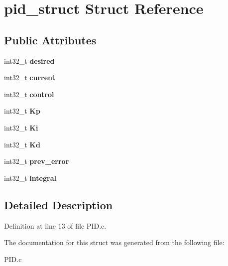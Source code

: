 \hypertarget{structpid__struct}{
\section{pid\_\-struct Struct Reference}
\label{structpid__struct}
}
\subsection*{Public Attributes}
\begin{DoxyCompactItemize}
\item 
\hypertarget{structpid__struct_ab1f8874dfbb425f23481694b028985fb}{
int32\_\-t {\bfseries desired}}
\label{structpid__struct_ab1f8874dfbb425f23481694b028985fb}

\item 
\hypertarget{structpid__struct_a08e606f52b5b2e860ffdb65c5ccaf6fd}{
int32\_\-t {\bfseries current}}
\label{structpid__struct_a08e606f52b5b2e860ffdb65c5ccaf6fd}

\item 
\hypertarget{structpid__struct_ae6ce74890cdac4ff749e9d88ba096669}{
int32\_\-t {\bfseries control}}
\label{structpid__struct_ae6ce74890cdac4ff749e9d88ba096669}

\item 
\hypertarget{structpid__struct_a297542ec10ace7967a610ebddd274d02}{
int32\_\-t {\bfseries Kp}}
\label{structpid__struct_a297542ec10ace7967a610ebddd274d02}

\item 
\hypertarget{structpid__struct_a7f05f52bfd3d91746d67978c9c21720f}{
int32\_\-t {\bfseries Ki}}
\label{structpid__struct_a7f05f52bfd3d91746d67978c9c21720f}

\item 
\hypertarget{structpid__struct_a4c1e8931dca87472ad443d0e7057b3ac}{
int32\_\-t {\bfseries Kd}}
\label{structpid__struct_a4c1e8931dca87472ad443d0e7057b3ac}

\item 
\hypertarget{structpid__struct_a34fe8410d19fd3fb7d18a7b6b3f48935}{
int32\_\-t {\bfseries prev\_\-error}}
\label{structpid__struct_a34fe8410d19fd3fb7d18a7b6b3f48935}

\item 
\hypertarget{structpid__struct_a6d0d21dfea09aac3ae6e94a3b8acd523}{
int32\_\-t {\bfseries integral}}
\label{structpid__struct_a6d0d21dfea09aac3ae6e94a3b8acd523}

\end{DoxyCompactItemize}


\subsection{Detailed Description}


Definition at line 13 of file PID.c.



The documentation for this struct was generated from the following file:\begin{DoxyCompactItemize}
\item 
PID.c\end{DoxyCompactItemize}
